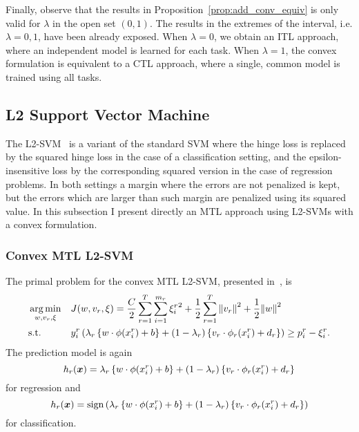 Finally, observe that the results in Proposition~\ref{prop:add_conv_equiv} is only valid for $\lambda$ in the open set $(0, 1)$. The results in the extremes of the interval, i.e. $\lambda=0, 1$, have been already exposed. When $\lambda=0$, we obtain an ITL approach, where an independent model is learned for each task. When $\lambda=1$, the convex formulation is equivalent to a CTL approach, where a single, common model is trained using all tasks.


\subsection{L2 Support Vector Machine}
The L2-SVM~\cite{Burges98} is a variant of the standard SVM where the hinge loss is replaced by the squared hinge loss in the case of a classification setting, and the epsilon-insensitive loss by the corresponding squared version in the case of regression problems. In both settings a margin where the errors are not penalized is kept, but the errors which are larger than such margin are penalized using its squared value.
In this subsection I present directly an MTL approach using L2-SVMs with a convex formulation.

\subsubsection{{Convex} MTL L2-SVM}
The primal problem for the convex MTL L2-SVM, presented in~\cite{RuizAD21}, is
\begin{equation}\label{eq:svmmtl_primal_convex_l2}
    \begin{aligned}
    & \argmin_{w, {v}_r, \xi}
    & & {J({w}, {v}_r, \xi) = \frac{C}{2} \sum_{r= 1}^T \sum_{i=1}^{m_r} {\xi_{i}^r}^2 + \frac{1}{2} \sum_{r= 1}^T{\norm{{v}_r}^2} + \frac{1}{2} {\norm{{w}}}^2} \\
    & \text{s.t.}
    & & y_{i}^r \left(\lambda_r \left\lbrace {w} \cdot \phi(x_{i}^r) + b  \right\rbrace + (1 - \lambda_r) \left\lbrace {v}_r \cdot \phi_r(x_{i}^r) + d_r \right\rbrace  \right) \geq p_{i}^r - \xi_{i}^r .  \\
    \end{aligned}
\end{equation}
The prediction model is again
\begin{equation}
    \nonumber
    h_r(\bm{x}) = \lambda_r \left\lbrace {w} \cdot \phi(x_{i}^r) + b  \right\rbrace + (1 - \lambda_r) \left\lbrace {v}_r \cdot \phi_r(x_{i}^r) + d_r \right\rbrace
\end{equation}
for regression and 
\begin{equation}
    \nonumber
    h_r(\bm{x}) = \operatorname{sign}{ \left(\lambda_r \left\lbrace {w} \cdot \phi(x_{i}^r) + b  \right\rbrace + (1 - \lambda_r) \left\lbrace {v}_r \cdot \phi_r(x_{i}^r) + d_r \right\rbrace \right)}
\end{equation}
for classification.
%

